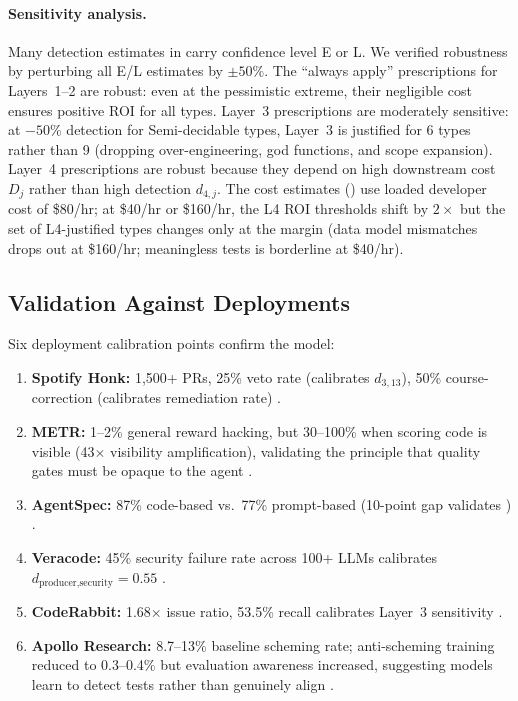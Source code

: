 \documentclass[11pt, a4paper, logo, copyright]{googledeepmind}
\begin{document}
\paragraph{Sensitivity analysis.} Many detection estimates in  carry confidence level E or L. We verified robustness by perturbing all E/L estimates by $\pm 50\%$. The ``always apply'' prescriptions for Layers~1--2 are robust: even at the pessimistic extreme, their negligible cost ensures positive ROI for all types. Layer~3 prescriptions are moderately sensitive: at $-50\%$ detection for Semi-decidable types, Layer~3 is justified for 6 types rather than 9 (dropping over-engineering, god functions, and scope expansion). Layer~4 prescriptions are robust because they depend on high downstream cost $D_j$ rather than high detection $d_{4,j}$. The cost estimates () use loaded developer cost of \$80/hr; at \$40/hr or \$160/hr, the L4 ROI thresholds shift by $2\times$ but the set of L4-justified types changes only at the margin (data model mismatches drops out at \$160/hr; meaningless tests is borderline at \$40/hr).

\subsection{Validation Against Deployments}

Six deployment calibration points confirm the model:

\begin{enumerate}
\item \textbf{Spotify Honk:} 1,500+ PRs, 25\% veto rate (calibrates $d_{3,13}$), 50\% course-correction (calibrates remediation rate) \citep{spotify2025}.
\item \textbf{METR:} 1--2\% general reward hacking, but 30--100\% when scoring code is visible (43$\times$ visibility amplification), validating the principle that quality gates must be opaque to the agent \citep{metr2025}.
\item \textbf{AgentSpec:} 87\% code-based vs.\ 77\% prompt-based (10-point gap validates ) \citep{wang2026agentspec}.
\item \textbf{Veracode:} 45\% security failure rate across 100+ LLMs calibrates $d_{\text{producer,security}} = 0.55$ \citep{veracode2025}.
\item \textbf{CodeRabbit:} 1.68$\times$ issue ratio, 53.5\% recall calibrates Layer~3 sensitivity \citep{coderabbit2025}.
\item \textbf{Apollo Research:} 8.7--13\% baseline scheming rate; anti-scheming training reduced to 0.3--0.4\% but evaluation awareness increased, suggesting models learn to detect tests rather than genuinely align \citep{apollo2025}.
\end{enumerate}
\end{document}
